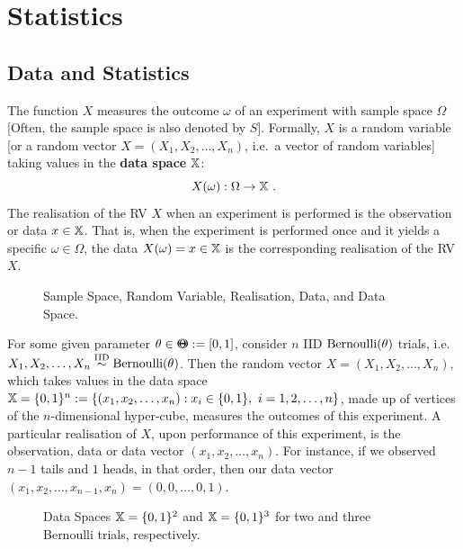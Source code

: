 \section{Statistics}\label{S:Statistics}

\subsection{Data and Statistics}\label{S:DataStats}

\begin{definition}[Data]
The function $X$ measures the outcome $\omega$ of an experiment with sample space $\Omega$ [Often, the sample space is also denoted by $S$].  Formally, $X$ is a random variable [or a random vector $X=(X_1,X_2,\ldots,X_n)$, i.e.~a vector of random variables] taking  values in the {\bf data space} $\mathbb{X}$:
\[
X(\omega):\Omega \to \mathbb{X} \ .
\]
The realisation of the RV $X$ when an experiment is performed is the observation or data $x \in \mathbb{X}$.  That is, when the experiment is performed once and it yields a specific $\omega \in \Omega$, the data $X(\omega)=x \in \mathbb{X}$ is the corresponding realisation of the RV $X$.
\end{definition}

\begin{figure}[htpb]
\caption{Sample Space, Random Variable, Realisation, Data, and Data Space.\label{F:Data}}
\vspace{2.5in}
\end{figure}

\begin{example}
For some given parameter $\theta \in {\Theta}\mspace{-11 mu}{\Theta} := [0,1]$, consider $n$ IID $\mbox{{\rm Bernoulli}}(\theta)$ trials, i.e.~$X_1,X_2,\ldots,X_n \overset{{\rm IID}}{\sim} \mbox{{\rm Bernoulli}}(\theta)$.  Then the random vector $X=(X_1,X_2,\ldots,X_n)$, which takes values in the data space $\mathbb{X} = \{0,1\}^n := \{ (x_1,x_2,\ldots,x_n) : x_i \in \{0,1\}, \ i=1,2,\ldots,n \}$, made up of vertices of the $n$-dimensional hyper-cube, measures the outcomes of this experiment.  A particular realisation of $X$, upon performance of this experiment, is the observation, data or data vector $(x_1,x_2,\ldots,x_n)$.  For instance, if we observed $n-1$ tails and $1$ heads, in that order, then our data vector $(x_1,x_2,\ldots,x_{n-1},x_n) = (0,0,\ldots,0,1)$.
\end{example}

\begin{figure}
\caption{Data Spaces $\mathbb{X}=\{0,1\}^2$ and $\mathbb{X}=\{0,1\}^3$ for two and three Bernoulli trials, respectively.\label{F:BernoulliDataSpace2and3}}
\centering   {}
\end{figure}

